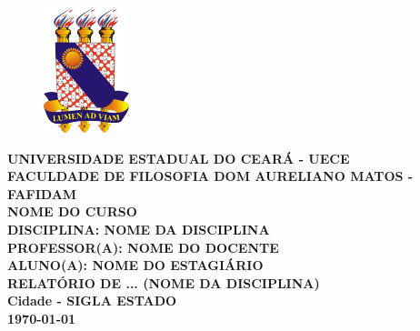 \documentclass[a4paper, 12 pt]{article}                                	%
\begin{document}
	
	

	
	\begin{titlepage}
		\begin{center}
			\begin{figure}
				\centering
				\includegraphics[scale=2.5]{figuras/uece.png}
			\end{figure}
			
			\large
			\textbf{UNIVERSIDADE ESTADUAL DO CEARÁ - UECE\\ \vspace{0.5cm}
				FACULDADE DE FILOSOFIA DOM AURELIANO MATOS - FAFIDAM\\ \vspace{0.5cm} %
				NOME DO CURSO \\ \vspace{0.5cm}
				DISCIPLINA: NOME DA DISCIPLINA \\ \vspace{0.5cm}
				PROFESSOR(A): NOME DO DOCENTE\\ \vspace{0.5cm}
				ALUNO(A):\textnormal{ NOME DO ESTAGIÁRIO} \\ \vspace{5cm}
				RELATÓRIO DE ... (NOME DA DISCIPLINA) \\ \vspace{7cm}
				Cidade - SIGLA ESTADO \\ \vspace{0.5cm} \today{}}  %
		\end{center}
	\end{titlepage}
\end{document}
